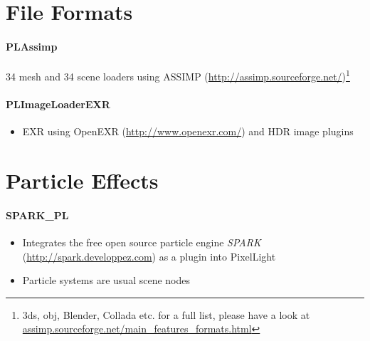 \section{File Formats}


\paragraph{PLAssimp}
34 mesh and 34 scene loaders using \ac{ASSIMP} (\url{http://assimp.sourceforge.net/})\footnote{3ds, obj, Blender, Collada etc. for a full list, please have a look at \url{assimp.sourceforge.net/main_features_formats.html}}


\paragraph{PLImageLoaderEXR}
\begin{itemize}
\item{EXR using OpenEXR (\url{http://www.openexr.com/}) and \ac{HDR} image plugins}
\end{itemize}




\section{Particle Effects}


\paragraph{SPARK\_PL}
\begin{itemize}
\item{Integrates the free open source particle engine \emph{SPARK} (\url{http://spark.developpez.com}) as a plugin into PixelLight}
\item{Particle systems are usual scene nodes}
\end{itemize}


